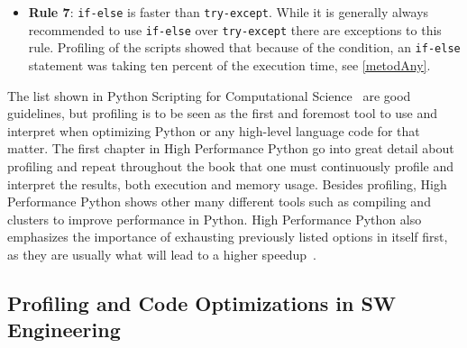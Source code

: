 \documentclass[12pt, a4paper]{article}
\begin{document}
\begin{itemize}
    \item \textbf{Rule 7}: \texttt{if-else} is faster than \texttt{try-except}.
    While it is generally always recommended to use \texttt{if-else} over \texttt{try-except} there are exceptions to this rule.
    Profiling of the scripts showed that because of the condition, an \texttt{if-else} statement was taking ten percent of the execution time, see \cref{metodAny}.


\end{itemize}

The list shown in Python Scripting for Computational Science~\cite{pythonBook} are good guidelines, but profiling is to be seen as the first and foremost tool to use and interpret when optimizing Python or any high-level language code for that matter.
The first chapter in High Performance Python go into great detail about profiling and repeat throughout the book that one must continuously profile and interpret the results, both execution and memory usage.
Besides profiling, High Performance Python shows other many different tools such as compiling and clusters to improve performance in Python.
High Performance Python also emphasizes the importance of exhausting previously listed options in itself first, as they are usually what will lead to a higher speedup~\cite{oreillyCh10}.

\subsection{Profiling and Code Optimizations in SW Engineering}
\end{document}
